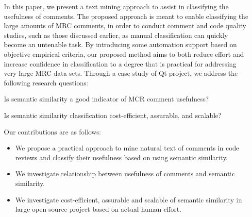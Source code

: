 



In this paper, we present a text mining approach to assist in classifying the usefulness of comments.
The proposed approach is meant to enable classifying the large amounts of MRC comments, in order to conduct comment and code quality studies, such as those discussed earlier, as manual classification can quickly become an untenable task.
By introducing some automation support based on objective empirical criteria,
our proposed method aims to both reduce effort and increase confidence in classification to a degree that is practical for addressing very large MRC data sets.
Through a case study of Qt project, we address the following research questions:
\begin{description}[leftmargin=3em,style=nextline]
\item[RQ1:] Is semantic similarity a good indicator of MCR comment usefulness?\\
\item[RQ2:] Is semantic similarity classification cost-efficient, assurable, and scalable?
\end{description}

Our contributions are as follows:
\begin{itemize}
\item We propose a practical approach to mine natural text of comments in code reviews and classify their usefulness based on using semantic similarity.
\item We investigate relationship between usefulness of comments and semantic similarity.
\item We investigate cost-efficient, assurable and scalable of semantic similarity in large open source project based on actual human effort.
\end{itemize}

